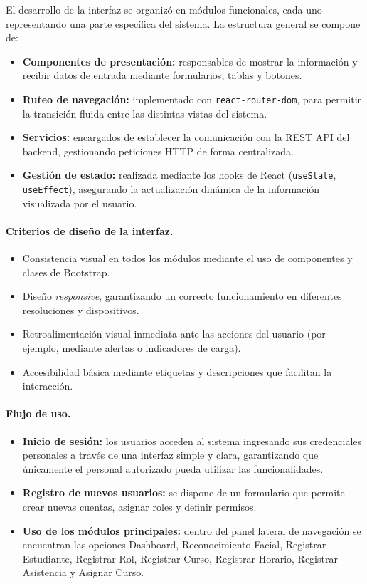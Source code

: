 El desarrollo de la interfaz se organizó en módulos funcionales, cada uno representando una parte específica del sistema. La estructura general se compone de:
\begin{itemize}
  \item \textbf{Componentes de presentación:} responsables de mostrar la información y recibir datos de entrada mediante formularios, tablas y botones.
  \item \textbf{Ruteo de navegación:} implementado con \texttt{react-router-dom}, para permitir la transición fluida entre las distintas vistas del sistema.
  \item \textbf{Servicios:} encargados de establecer la comunicación con la REST API del backend, gestionando peticiones HTTP de forma centralizada.
  \item \textbf{Gestión de estado:} realizada mediante los hooks de React (\texttt{useState}, \texttt{useEffect}), asegurando la actualización dinámica de la información visualizada por el usuario.
\end{itemize}

\paragraph{Criterios de diseño de la interfaz.}
\begin{itemize}
  \item Consistencia visual en todos los módulos mediante el uso de componentes y clases de Bootstrap.
  \item Diseño \textit{responsive}, garantizando un correcto funcionamiento en diferentes resoluciones y dispositivos.
  \item Retroalimentación visual inmediata ante las acciones del usuario (por ejemplo, mediante alertas o indicadores de carga).
  \item Accesibilidad básica mediante etiquetas y descripciones que facilitan la interacción.
\end{itemize}

\paragraph{Flujo de uso.}
\begin{itemize}
  \item \textbf{Inicio de sesión:} los usuarios acceden al sistema ingresando sus credenciales personales a través de una interfaz simple y clara, garantizando que únicamente el personal autorizado pueda utilizar las funcionalidades.
  \item \textbf{Registro de nuevos usuarios:} se dispone de un formulario que permite crear nuevas cuentas, asignar roles y definir permisos.
  \item \textbf{Uso de los módulos principales:} dentro del panel lateral de navegación se encuentran las opciones Dashboard, {Reconocimiento Facial}, {Registrar Estudiante}, {Registrar Rol}, {Registrar Curso}, {Registrar Horario}, {Registrar Asistencia} y {Asignar Curso}.
\end{itemize}



